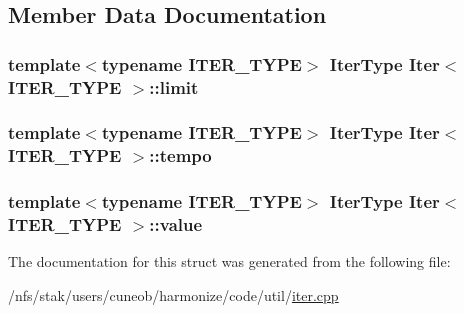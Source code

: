\subsection{Member Data Documentation}
\hypertarget{structIter_a1598d0eda557abbdc9586e48fd43e976}{
\subsubsection[{limit}]{\setlength{\rightskip}{0pt plus 5cm}template$<$typename I\-T\-E\-R\-\_\-\-T\-Y\-P\-E$>$ {\bf Iter\-Type} {\bf Iter}$<$ I\-T\-E\-R\-\_\-\-T\-Y\-P\-E $>$\-::limit}}\label{structIter_a1598d0eda557abbdc9586e48fd43e976}
\hypertarget{structIter_a151cfe1f2432438792333d6b1eced4c0}{
\subsubsection[{tempo}]{\setlength{\rightskip}{0pt plus 5cm}template$<$typename I\-T\-E\-R\-\_\-\-T\-Y\-P\-E$>$ {\bf Iter\-Type} {\bf Iter}$<$ I\-T\-E\-R\-\_\-\-T\-Y\-P\-E $>$\-::tempo}}\label{structIter_a151cfe1f2432438792333d6b1eced4c0}
\hypertarget{structIter_aeb1ab085577c3d26dcc3ae52a3b452e8}{
\subsubsection[{value}]{\setlength{\rightskip}{0pt plus 5cm}template$<$typename I\-T\-E\-R\-\_\-\-T\-Y\-P\-E$>$ {\bf Iter\-Type} {\bf Iter}$<$ I\-T\-E\-R\-\_\-\-T\-Y\-P\-E $>$\-::value}}\label{structIter_aeb1ab085577c3d26dcc3ae52a3b452e8}


The documentation for this struct was generated from the following file\-:\begin{DoxyCompactItemize}
\item 
/nfs/stak/users/cuneob/harmonize/code/util/\hyperlink{iter_8cpp}{iter.\-cpp}\end{DoxyCompactItemize}
